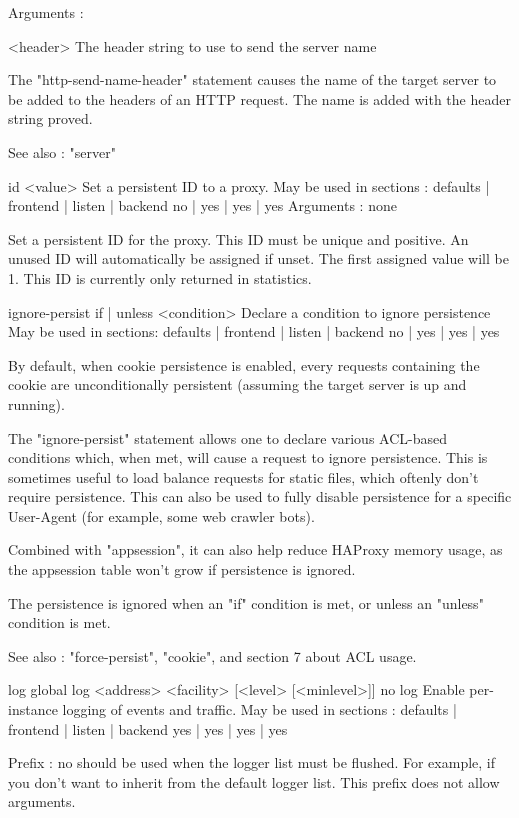   Arguments :

    <header>  The header string to use to send the server name

  The "http-send-name-header" statement causes the name of the target
  server to be added to the headers of an HTTP request.  The name
  is added with the header string proved.

  See also : "server"

id <value>
  Set a persistent ID to a proxy.
  May be used in sections :   defaults | frontend | listen | backend
                                  no   |    yes   |   yes  |   yes
  Arguments : none

  Set a persistent ID for the proxy. This ID must be unique and positive.
  An unused ID will automatically be assigned if unset. The first assigned
  value will be 1. This ID is currently only returned in statistics.


ignore-persist { if | unless } <condition>
  Declare a condition to ignore persistence
  May be used in sections:    defaults | frontend | listen | backend
                                  no   |    yes   |   yes  |   yes

  By default, when cookie persistence is enabled, every requests containing
  the cookie are unconditionally persistent (assuming the target server is up
  and running).

  The "ignore-persist" statement allows one to declare various ACL-based
  conditions which, when met, will cause a request to ignore persistence.
  This is sometimes useful to load balance requests for static files, which
  oftenly don't require persistence. This can also be used to fully disable
  persistence for a specific User-Agent (for example, some web crawler bots).

  Combined with "appsession", it can also help reduce HAProxy memory usage, as
  the appsession table won't grow if persistence is ignored.

  The persistence is ignored when an "if" condition is met, or unless an
  "unless" condition is met.

  See also : "force-persist", "cookie", and section 7 about ACL usage.


log global
log <address> <facility> [<level> [<minlevel>]]
no log
  Enable per-instance logging of events and traffic.
  May be used in sections :   defaults | frontend | listen | backend
                                 yes   |    yes   |   yes  |   yes

  Prefix :
    no         should be used when the logger list must be flushed. For example,
               if you don't want to inherit from the default logger list. This
               prefix does not allow arguments.

